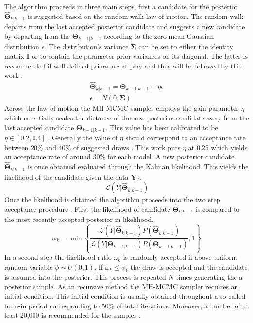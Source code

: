 \documentclass[12pt,a4paper,english]{article} %
\newcommand{\matr}[1]{\mathbf{#1}} %
\newcommand{\Lagr}{\mathcal{L}} %
\begin{document}
	The algorithm proceeds in three main steps, first a candidate for the posterior $\matr{\hat{\Theta}}_{k|k-1}$ is suggested based on the random-walk law of motion. The random-walk departs from the last accepted posterior candidate and suggests a new candidate by departing from the $\matr{\Theta}_{k-1|k-1}$ according to the zero-mean Gaussian distribution $\epsilon$. The distribution's variance $\matr{\Sigma}$ can be set to either the identity matrix $\matr{I}$ or to contain the parameter prior variances on its diagonal. The latter is recommended if well-defined priors are at play and thus will be followed by this work \cite{herbst_bayesian_2016}.
	\begin{equation}
		\begin{aligned}
			\matr{\hat{\Theta}}_{k|k-1} = \matr{\Theta}_{k-1|k-1} + \eta \epsilon \\
			\epsilon = N(0, \matr{\Sigma})
		\end{aligned}
	\end{equation}
	Across the law of motion the \ac{MH-MCMC} sampler employs the gain parameter $\eta$ which essentially scales the distance of the new posterior candidate away from the last accepted candidate $\matr{\Theta}_{k-1|k-1}$. This value has been calibrated to be $\eta \in [0.2, 0.4]$ \cite{gelman_weak_1997}. Generally the value of $\eta$ should correspond to an acceptance rate between 20\% and 40\% of suggested draws \cite{herbst_bayesian_2016}. This work puts $\eta$ at 0.25 which yields an acceptance rate of around 30\% for each model.
	A new posterior candidate $\matr{\hat{\Theta}}_{k|k-1}$ is once obtained evaluated through the Kalman likelihood. This yields the likelihood of the candidate given the data $\matr{Y}_T$.
	\[
		 \Lagr(Y| \matr{\hat{\Theta}}_{k|k-1})
	\]
	Once the likelihood is obtained the algorithm proceeds into the two step acceptance procedure \cite{guerron-quintana_bayesian_2013}. First the likelihood of candidate $\matr{\hat{\Theta}}_{k|k-1}$ is compared to the most recently accepted posterior in likelihood.
	\begin{equation}
		\omega_k = \min \left\{ \frac{ \Lagr(Y|\matr{\hat{\Theta}}_{k|k-1}) P(\matr{\hat{\Theta}}_{k|k-1})}{\Lagr(Y| \matr{\Theta}_{k-1|k-1})  P(\matr{\Theta}_{k-1|k-1})}, 1 \right\}
	\end{equation}
	In a second step the likelihood ratio $\omega_k$ is randomly accepted if above uniform random variable $\phi \sim U(0, 1)$. If $\omega_k \leq \phi_k$ the draw is accepted and the candidate is assumed into the posterior. This process is repeated $N$ times generating the a posterior sample. 
	As an recursive method the MH-MCMC sampler requires an initial condition. This initial condition is usually obtained throughout a so-called burn-in period corresponding to 50\% of total iterations. Moreover, a number of at least 20,000 is recommended for the sampler \cite{herbst_bayesian_2016}.
	
\end{document}
